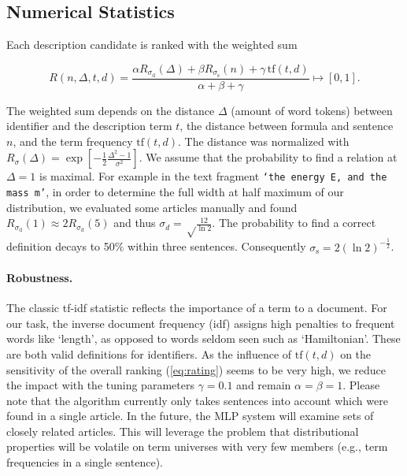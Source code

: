 \documentclass[runningheads]{llncs}
\begin{document}
\subsection{Numerical Statistics}

Each description candidate is ranked with the weighted sum

\begin{equation} \label{eq:rating}
R(n,\Delta,t,d)=\frac{\alpha{R}_{\sigma_\mathrm d}(\Delta)
+\beta{R}_{\sigma_\mathrm s}(n)
+\gamma\,\mathrm{tf}(t,d)}{\alpha+\beta+\gamma} \mapsto [0,1].
\end{equation}

The weighted sum depends on the distance $\Delta$ (amount of word tokens) between
identifier and the description term $t$, the distance between formula and sentence $n$,
and the term frequency $\mathrm{tf}(t,d)$. The
distance was normalized with $R_\sigma(\Delta) = \exp\left[ -\frac{1}{2}
\frac{\Delta^2-1}{\sigma^2}\right].$ We assume that the probability to find a
relation at $\Delta=1$ is maximal. For example in the text fragment
\texttt{`the energy E, and the mass m'}, in order to determine the full width
at half maximum of our distribution, we evaluated some articles manually and
found $R_{\sigma_\mathrm d}(1)\approx 2 R_{\sigma_\mathrm d}(5)$ and thus
$\sigma_d=\sqrt\frac{12}{\ln 2}$. The probability to find a correct definition
decays to 50\% within three sentences. Consequently $\sigma_\mathrm
s=2\left({\ln 2}\right)^{-\frac{1}{2}}$.


\paragraph{Robustness.}

The classic tf-idf \cite{Salton86} statistic reflects the importance of a term
to a document. For our task, the inverse document frequency (idf) assigns
high penalties to frequent words like `length', as opposed to words seldom
seen such as `Hamiltonian'. These are both valid definitions for identifiers.
As the influence of $\mathrm{tf}(t,d)$ on the sensitivity of the overall ranking
(\ref{eq:rating}) seems to be very high, we reduce the impact with the tuning
parameters $\gamma=0.1$ and remain $\alpha = \beta = 1$. Please note that the algorithm
currently only takes sentences into account which were found in a single article.
In the future, the MLP system will examine sets of closely related articles.
This will leverage the problem that distributional properties will be volatile on
term universes with very few members (e.g., term frequencies in a single sentence).
\end{document}
